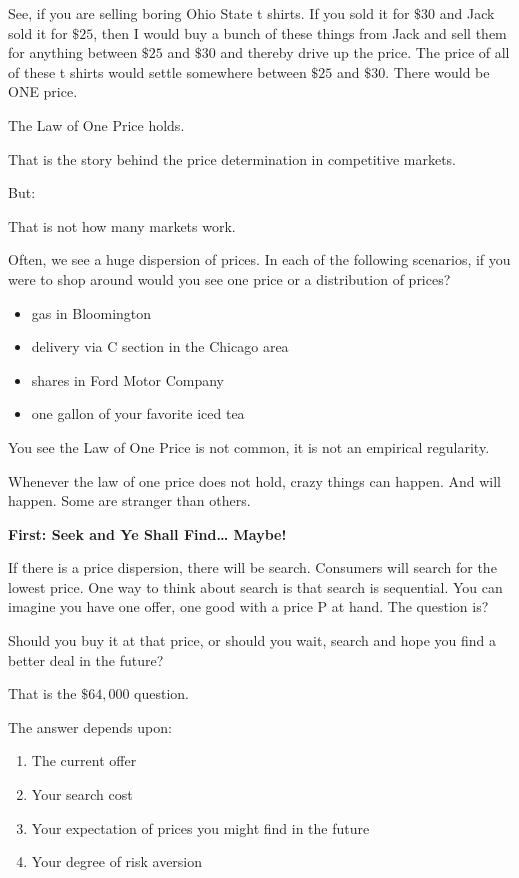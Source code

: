 \documentclass[
]{book}
\providecommand{\tightlist}{%
  \setlength{\itemsep}{0pt}\setlength{\parskip}{0pt}}
\begin{document}
See, if you are selling boring Ohio State t shirts. If you sold it for \(\$30\) and Jack sold it for \(\$25\), then I would buy a bunch of these things from Jack and sell them for anything between \(\$25\) and \(\$30\) and thereby drive up the price. The price of all of these t shirts would settle somewhere between \(\$25\) and \(\$30\). There would be ONE price.

The Law of One Price holds.

That is the story behind the price determination in competitive markets.

But:

That is not how many markets work.

Often, we see a huge dispersion of prices. In each of the following scenarios, if you were to shop around would you see one price or a distribution of prices?

\begin{itemize}
\item
  gas in Bloomington
\item
  delivery via C section in the Chicago area
\item
  shares in Ford Motor Company
\item
  one gallon of your favorite iced tea
\end{itemize}

You see the Law of One Price is not common, it is not an empirical regularity.

Whenever the law of one price does not hold, crazy things can happen. And will happen. Some are stranger than others.

\textbf{First: Seek and Ye Shall Find\ldots{} Maybe!}

If there is a price dispersion, there will be search. Consumers will search for the lowest price. One way to think about search is that search is sequential. You can imagine you have one offer, one good with a price P at hand. The question is?

Should you buy it at that price, or should you wait, search and hope you find a better deal in the
future?

That is the \(\$64,000\) question.

The answer depends upon:

\begin{enumerate}
\def\labelenumi{\alph{enumi}.}
\tightlist
\item
  The current offer
\item
  Your search cost
\item
  Your expectation of prices you might find in the future
\item
  Your degree of risk aversion
\end{enumerate}
\end{document}
